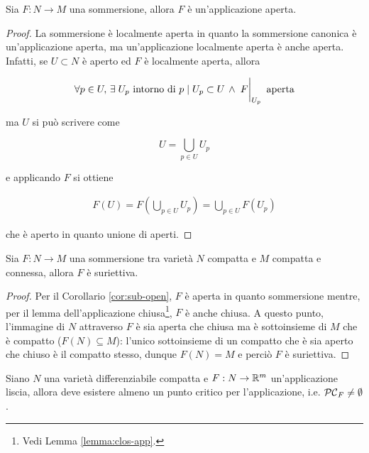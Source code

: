 \begin{corollary}\label{cor:sub-open}
	Sia $ F : N \to M $ una sommersione, allora $ F $ è un'applicazione aperta.
\end{corollary}

\begin{proof}
	La sommersione è localmente aperta in quanto la sommersione canonica è un'applicazione aperta, ma un'applicazione localmente aperta è anche aperta. Infatti, se $ U \subset N $ è aperto ed $ F $ è localmente aperta, allora
	
	\begin{equation}
		\forall p \in U, \, \E U_{p} \text{ intorno di } p \mid U_{p} \subset U \, \wedge \, \eval{F}_{U_{p}} \text{ aperta}
	\end{equation}

	ma $ U $ si può scrivere come
	
	\begin{equation}
		U = \bigcup_{p \in U} U_{p}
	\end{equation}

	e applicando $ F $ si ottiene
	
	\begin{align}
		F(U) = F \left( \bigcup_{p \in U} U_{p} \right) %
		= \bigcup_{p \in U} F(U_{p})
	\end{align}

	che è aperto in quanto unione di aperti.
\end{proof}

\begin{corollary}\label{cor:sub-comp-conn-surj}
	Sia $ F : N \to M $ una sommersione tra varietà $ N $ compatta e $ M $ compatta e connessa, allora $ F $ è suriettiva.
\end{corollary}

\begin{proof}
	Per il Corollario \ref{cor:sub-open}, $ F $ è aperta in quanto sommersione mentre, per il lemma dell'applicazione chiusa\footnote{%
		Vedi Lemma \ref{lemma:clos-app}.%
	}, $ F $ è anche chiusa. A questo punto, l'immagine di $ N $ attraverso $ F $ è sia aperta che chiusa ma è sottoinsieme di $ M $ che è compatto ($ F(N) \subseteq M $): l'unico sottoinsieme di un compatto che è sia aperto che chiuso è il compatto stesso, dunque $ F(N) = M $ e perciò $ F $ è suriettiva.
\end{proof}

\begin{corollary}
	Siano $ N $ una varietà differenziabile compatta e $ F : N \to \mathbb{R}^{m} $ un'applicazione liscia, allora deve esistere almeno un punto critico per l'applicazione, i.e. $ \mathcal{PC}_{F} \neq \emptyset $.
\end{corollary}

